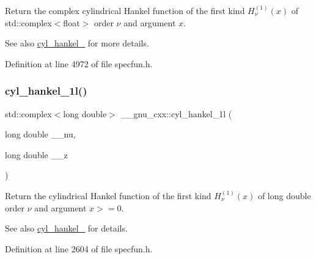 Return the complex cylindrical Hankel function of the first kind $ H^{(1)}_\nu(x) $ of {\ttfamily std\+::complex$<$float$>$} order $ \nu $ and argument $ x $.

\begin{DoxySeeAlso}{See also}
\hyperlink{group__gnu__math__spec__func_ga5329bba77d10a9d2f15d9bbe43a70db3}{cyl\+\_\+hankel\+\_} for more details. 
\end{DoxySeeAlso}


Definition at line 4972 of file specfun.\+h.

\mbox{\label{group__gnu__math__spec__func_gacb49c66b4267fbc56906db02f14365f2}} 
\subsubsection{\texorpdfstring{cyl\+\_\+hankel\+\_\+1l()}{cyl\_hankel\_1l()}\hspace{0.1cm}{\footnotesize\ttfamily [1/2]}}
{\footnotesize\ttfamily std\+::complex$<$long double$>$ \+\_\+\+\_\+gnu\+\_\+cxx\+::cyl\+\_\+hankel\+\_\+1l (\begin{DoxyParamCaption}\item[{long double}]{\+\_\+\+\_\+nu,  }\item[{long double}]{\+\_\+\+\_\+z }\end{DoxyParamCaption})\hspace{0.3cm}{\ttfamily [inline]}}

Return the cylindrical Hankel function of the first kind $ H^{(1)}_\nu(x) $ of {\ttfamily long double} order $ \nu $ and argument $ x >= 0 $.

\begin{DoxySeeAlso}{See also}
\hyperlink{group__gnu__math__spec__func_ga5329bba77d10a9d2f15d9bbe43a70db3}{cyl\+\_\+hankel\+\_} for details. 
\end{DoxySeeAlso}


Definition at line 2604 of file specfun.\+h.

\mbox{\label{group__gnu__math__spec__func_ga6900f79ec70673bcb001538aec74e07c}} 
